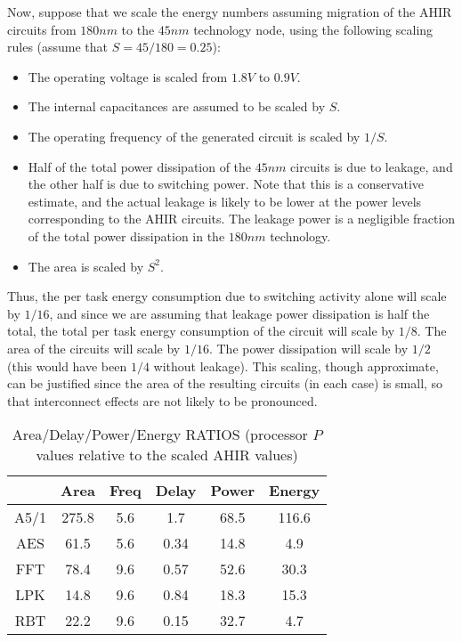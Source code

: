 \documentclass[conference]{IEEEtran}
\begin{document}
Now, suppose
that  we scale the 
energy numbers assuming migration of the AHIR circuits
from $180nm$ to the $45nm$ technology node, using 
the following  scaling rules (assume that $S = 45/180 = 0.25$):
\begin{itemize}
\item The operating voltage is scaled from $1.8V$ to $0.9V$.
\item The internal capacitances are assumed to be scaled by $S$.
\item The operating frequency of the generated circuit is scaled
by $1/S$.
\item Half of the total power dissipation of the $45nm$ circuits
is due to leakage\cite{ref:Frank}, and the other half is due to switching power. 
Note that this is a conservative estimate, and the actual leakage is
likely to be lower at the power levels corresponding to the
AHIR circuits.
%
% 
The leakage power is a negligible fraction of the
total power dissipation in the $180nm$ technology.
\item The area is scaled by $S^2$.
\end{itemize}
Thus, the per task energy consumption due to switching
activity alone will scale by $1/16$, and since
we are assuming that leakage power dissipation is half the total,
the total per task energy consumption of the circuit will 
scale by $1/8$.
The area of the circuits will scale by $1/16$.  
The power dissipation will scale by $1/2$ (this would have been
$1/4$ without leakage).
This scaling, though approximate, can be justified since the 
area of the resulting circuits (in each case) is small, so 
that interconnect effects are not likely to be pronounced.

\begin{table}[htb]
  \centering
  \caption{Area/Delay/Power/Energy RATIOS (processor $P$ values relative to the scaled AHIR values)}
  \label{table:Ratios}
  \renewcommand\arraystretch{1.2}
  \setlength{\tabcolsep}{1ex}
  \begin{tabular}{c|c|c|c|c|c}
    \hline
    & Area & Freq & Delay & Power & Energy \\
    \hline
    \hline
    A5/1 & 275.8 & 5.6 & 1.7 & 68.5 & 116.6  \\
    \hline
    AES & 61.5 & 5.6 & 0.34 & 14.8 & 4.9 \\
    \hline
    FFT & 78.4 & 9.6 & 0.57 & 52.6 & 30.3  \\
    \hline
    LPK & 14.8 & 9.6 & 0.84 & 18.3 & 15.3  \\
    \hline
    RBT & 22.2 & 9.6 & 0.15 & 32.7 & 4.7 \\
    \hline
  \end{tabular}

\end{table}
\end{document}
